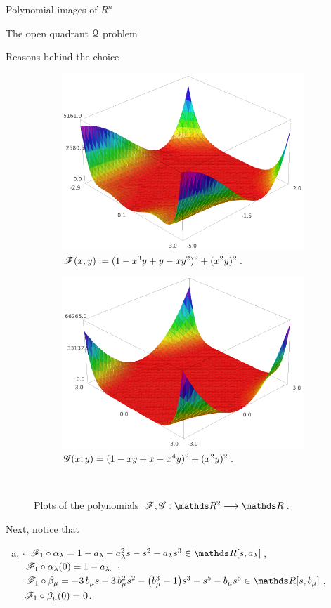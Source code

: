 \documentclass[11pt, a4paper, english, twoside, notitlepage, openright]{report}
\begin{document}
\begin{chapter}{Polynomial images of $R^n$}
\begin{section}{The open quadrant $\mathcal{Q}$ problem}
\begin{subsection}{Reasons behind the choice}
\begin{figure}[h]\hspace{-0.5cm}
\begin{subfigure}{.54\linewidth}\centering
\includegraphics[width=1\textwidth]{plots/ch1_04_F.png}
\caption{$\mathscr{F}(x,y):=(1-x^3y+y-xy^2)^2+(x^2y)^2$.\label{fig:F}}
\end{subfigure}
\begin{subfigure}{.55\linewidth}\centering
\includegraphics[width=1\textwidth]{plots/ch1_05_G.png}
\caption{$\mathscr{G}(x,y)=(1-xy+x-x^4y)^2+(x^2y)^2$.\label{fig:G}}
\end{subfigure}\\[1ex]
\caption{Plots of the polynomials $\F,\G:\R^2\longrightarrow\R$.\label{fig:plotFG}}
\end{figure}
Next, notice that
\begin{enumerate}[(a)]
\item $\cdot$ $\F_1\circ\alpha_\lambda=1-a_{\lambda}-a_{\lambda}^{2} s-s^{2}-a_{\lambda} s^{3}\in\R[s,a_{\lambda}]$,
$\, \mathscr{F}_1\circ\alpha_{\lambda }(0)=1-a_{\lambda. }$ \newline
$\cdot$ $\F_1\circ\beta_{\mu}=-3\,b_{\mu}s-3 \,b_{\mu}^{2} s^{2}-{\left(b_{\mu}^{3}-1\right)}s^{3}-s^{5}-b_{\mu}s^{6}\in\R[s,b_{\mu}]$,
$\, \mathscr{F}_1\circ\beta_{\mu}(0)=0$.
				

\end{enumerate}
\end{subsection}
\end{section}
\end{chapter}
\end{document}
